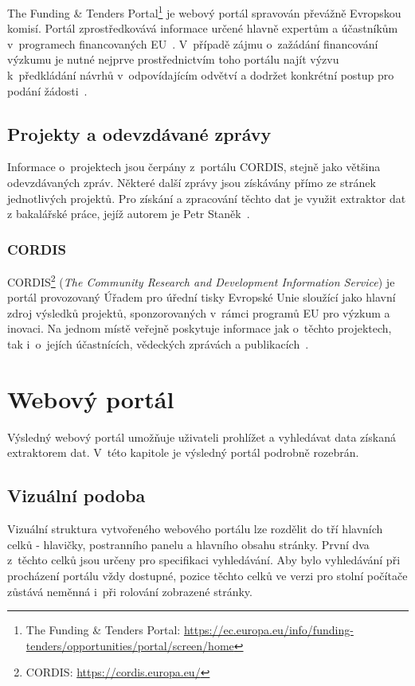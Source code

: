 The Funding \& Tenders Portal\footnote{The Funding \& Tenders Portal: \url{https://ec.europa.eu/info/funding-tenders/opportunities/portal/screen/home}} je webový portál spravován převážně Evropskou komisí. Portál zprostředkovává informace určené hlavně expertům a účastníkům v~programech financovaných EU~\cite{bib:funding-about}.
V~případě zájmu o~zažádání financování výzkumu je nutné nejprve prostřednictvím toho portálu najít výzvu k~předkládání návrhů v~odpovídajícím odvětví a dodržet konkrétní postup pro podání žádosti~\cite{bib:funding-find}.

\subsection{Projekty a odevzdávané zprávy}
Informace o~projektech jsou čerpány z~portálu CORDIS, stejně jako většina odevzdávaných zpráv. Některé další zprávy jsou získávány přímo ze stránek jednotlivých projektů. Pro získání a zpracování těchto dat je využit extraktor dat z bakalářské práce, jejíž autorem je Petr Staněk~\cite{bib:stanek}.

\subsubsection*{CORDIS}
CORDIS\footnote{CORDIS: \url{https://cordis.europa.eu/}} (\emph{The Community Research and Development Information Service}) je portál provozovaný Úřadem pro úřední tisky Evropské Unie sloužící jako hlavní zdroj výsledků projektů, sponzorovaných v~rámci programů EU pro výzkum a inovaci. Na jednom místě veřejně poskytuje informace jak o~těchto projektech, tak i~o~jejích účastnících, vědeckých zprávách a publikacích~\cite{bib:cordis}.



\section{Webový portál}
Výsledný webový portál umožňuje uživateli prohlížet a vyhledávat data získaná extraktorem dat. V~této kapitole je výsledný portál podrobně rozebrán.

\subsection{Vizuální podoba}
Vizuální struktura vytvořeného webového portálu lze rozdělit do tří hlavních celků - hlavičky, postranního panelu a hlavního obsahu stránky. První dva z~těchto celků jsou určeny pro specifikaci vyhledávání. Aby bylo vyhledávání při procházení portálu vždy dostupné, pozice těchto celků ve verzi pro stolní počítače zůstává neměnná i~při rolování zobrazené stránky.

